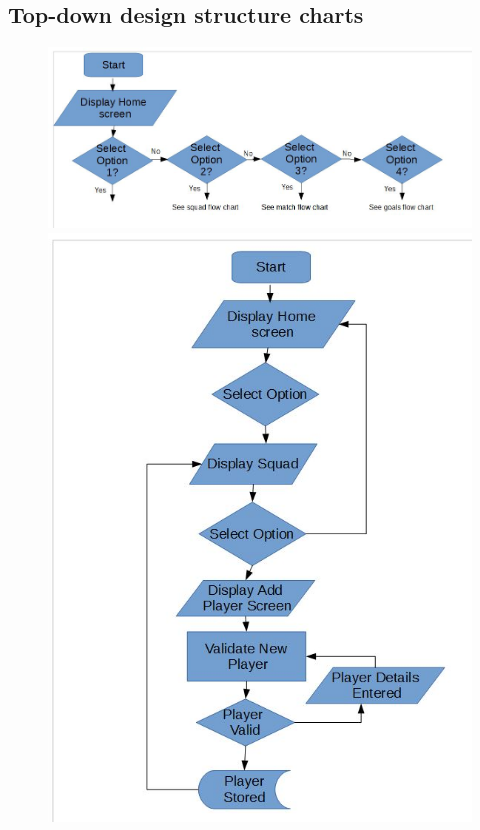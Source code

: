 \subsection{Top-down design structure charts}
\begin{figure}[H]
	\includegraphics{mainFC}
	\includegraphics{squadFc}

\end{figure}
